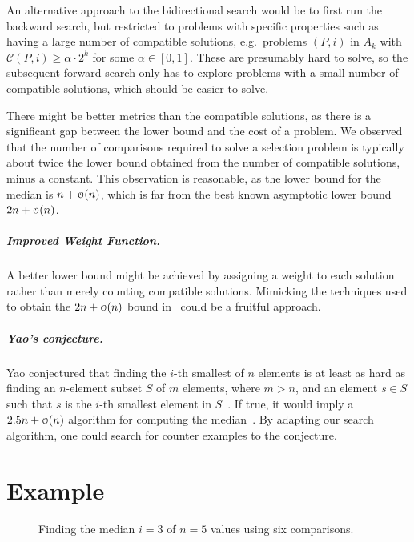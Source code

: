 \documentclass[a4paper,UKenglish,cleveref, autoref, thm-restate, anonymous]{lipics-v2021}
\newcommand\smallO{
\mathchoice
{{\scriptstyle\mathcal{O}}}%
{{\scriptstyle\mathcal{O}}}%
{{\scriptscriptstyle\mathcal{O}}}%
{\scalebox{.50}{$\scriptscriptstyle\mathcal{O}$}}%
}
\begin{document}
An alternative approach to the bidirectional search would be to first run the backward search, but restricted to problems with specific properties such as having a large number of compatible solutions, e.g.\ problems $(P, i)$ in $A_k$ with $\mathcal{C}(P, i) \ge \alpha \cdot 2^k$ for some $\alpha \in [0, 1]$.
These are presumably hard to solve, so the subsequent forward search only has to explore problems with a small number of compatible solutions, which should be easier to solve.

There might be better metrics than the compatible solutions, as there is a significant gap between the lower bound and the cost of a problem.
We observed that the number of comparisons required to solve a selection problem is typically about twice the lower bound obtained from the number of compatible solutions, minus a constant.
This observation is reasonable, as the lower bound for the median is $n + \smallO(n)$, which is far from the best known asymptotic lower bound $2n + \smallO(n)$.

\subparagraph{Improved Weight Function.}
A better lower bound might be achieved by assigning a weight to each solution rather than merely counting compatible solutions.
Mimicking the techniques used to obtain the $2n + \smallO(n)$ bound in~\cite{bent1985finding} could be a fruitful approach.

\subparagraph{Yao's conjecture.}
Yao conjectured that finding the $i$-th smallest of $n$ elements is at least as hard as finding an $n$-element subset $S$ of $m$ elements, where $m > n$, and an element $s \in S$ such that $s$ is the $i$-th smallest element in $S$~\cite{yao1974lower}.
If true, it would imply a $2.5n + \smallO(n)$ algorithm for computing the median~\cite{schonhage1975finding}.
By adapting our search algorithm, one could search for counter examples to the conjecture.

\clearpage



\clearpage
\appendix

\section{Example}
\begin{figure}[!b]
  \centering
  
  \caption{Finding the median $i = 3$ of $n = 5$ values using six comparisons.}
  \label{fig:median_of_5}
\end{figure}
\end{document}
